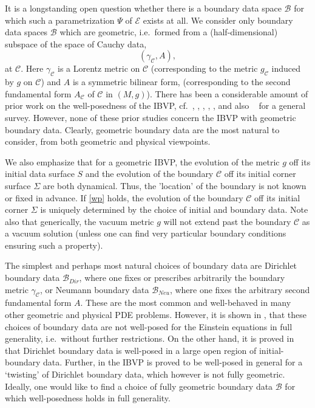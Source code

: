 \documentclass[10pt]{amsart}
\newcommand{\g}{\gamma}
\newcommand{\Si}{\Sigma}
\newcommand{\cC}{{\mathcal C}}
\newcommand{\cB}{{\mathcal B}}
\newcommand{\cE}{{\mathcal E}}
\newcommand{\<}{\langle}
\renewcommand{\>}{\rangle}
\theoremstyle{plain}
\theoremstyle{remark}
\theoremstyle{definition}
\numberwithin{equation}{section}
\begin{document}
 \medskip 

   It is a longstanding open question whether there is a boundary data space $\cB$ for which such a parametrization $\Psi$ of $\cE$ exists at all. 
We consider only boundary data spaces $\cB$ which are geometric, i.e.~formed from a (half-dimensional) subspace of the space of 
Cauchy data, 
$$(\g_{\cC}, A),$$
at $\cC$. Here $\g_{\cC}$ is a Lorentz metric on $\cC$ (corresponding to the metric $g_{\cC}$ induced by $g$ on $\cC$) and $A$ is a symmetric bilinear
 form, (corresponding to the second fundamental form $A_{\cC}$ of $\cC$ in $(M, g)$). There has been a considerable amount of prior work on the 
 well-posedness of the IBVP, cf.~\cite{FN}, \cite{KRSW1}, \cite{KRSW2}, \cite{KW}, \cite{FS1}, \cite{FS2} and also ~\cite{ST} for  a general survey. 
 However, none of these prior studies concern the IBVP with geometric boundary data. Clearly, geometric boundary data are the most natural to 
 consider, from both geometric and physical viewpoints. 
 
    We also emphasize that for a geometric IBVP, the evolution of the metric $g$ off its initial data surface $S$ and the evolution of 
the boundary $\cC$ off its initial corner surface $\Si$ are both dynamical. Thus, the 'location' of the boundary is not known or fixed 
in advance. If \eqref{wp} holds, the evolution of the boundary $\cC$ off its initial corner $\Si$ is uniquely determined by the choice
 of initial and boundary data. Note also that generically, the vacuum metric $g$ will not extend past the boundary $\cC$ as a vacuum 
 solution (unless one can find very particular boundary conditions ensuring such a property). 
 
 \medskip 
  
 The simplest and perhaps most natural choices of boundary data are Dirichlet boundary data $\cB_{Dir}$, where one fixes or prescribes arbitrarily the 
boundary metric $\g_{\cC}$, or Neumann boundary data $\cB_{Neu}$, where one fixes the arbitrary second fundamental form $A$. These are the most 
common and well-behaved in many other geometric and physical PDE problems. However, it is shown in \cite{A2}, \cite{AA2} that these choices 
of boundary data are not well-posed for the Einstein equations in full generality, i.e.~without further restrictions.  On the other hand, it is proved in 
\cite{I} that Dirichlet boundary data is well-posed in a large open region of initial-boundary data. Further, in \cite{II} the IBVP is proved to be 
well-posed in general for a `twisting' of Dirichlet boundary data, which however is not fully geometric. Ideally, one would like to find a choice of 
fully geometric boundary data $\cB$ for which well-posedness holds in full generality. 
\end{document}
